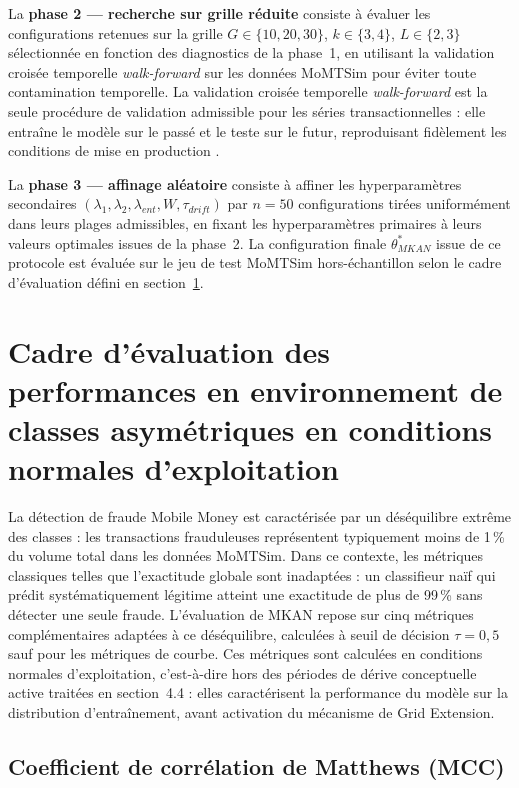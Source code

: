 \documentclass[11pt,a4paper,oneside]{report}
\theoremstyle{definition}
\theoremstyle{remark}
\begin{document}
La \textbf{phase 2 --- recherche sur grille réduite} consiste à évaluer les configurations retenues sur la grille $G \in \{10, 20, 30\}$, $k \in \{3, 4\}$, $L \in \{2, 3\}$ sélectionnée en fonction des diagnostics de la phase~1, en utilisant la validation croisée temporelle \textit{walk-forward} sur les données MoMTSim pour éviter toute contamination temporelle. La validation croisée temporelle \textit{walk-forward} est la seule procédure de validation admissible pour les séries transactionnelles : elle entraîne le modèle sur le passé et le teste sur le futur, reproduisant fidèlement les conditions de mise en production \citep{law2000simulation}.

La \textbf{phase 3 --- affinage aléatoire} consiste à affiner les hyperparamètres secondaires $(\lambda_1, \lambda_2, \lambda_{ent}, W, \tau_{drift})$ par $n = 50$ configurations tirées uniformément dans leurs plages admissibles, en fixant les hyperparamètres primaires à leurs valeurs optimales issues de la phase~2. La configuration finale $\theta^*_{MKAN}$ issue de ce protocole est évaluée sur le jeu de test MoMTSim hors-échantillon selon le cadre d'évaluation défini en section~\ref{sec:evaluation_framework}.

\section{Cadre d'évaluation des performances en environnement de classes asymétriques en conditions normales d'exploitation}
\label{sec:evaluation_framework}

La détection de fraude Mobile Money est caractérisée par un déséquilibre extrême des classes : les transactions frauduleuses représentent typiquement moins de 1\,\% du volume total dans les données MoMTSim. Dans ce contexte, les métriques classiques telles que l'exactitude globale sont inadaptées : un classifieur naïf qui prédit systématiquement \og légitime \fg{} atteint une exactitude de plus de 99\,\% sans détecter une seule fraude. L'évaluation de MKAN repose sur cinq métriques complémentaires adaptées à ce déséquilibre, calculées à seuil de décision $\tau = 0{,}5$ sauf pour les métriques de courbe. Ces métriques sont calculées en conditions normales d'exploitation, c'est-à-dire hors des périodes de dérive conceptuelle active traitées en section~4.4 : elles caractérisent la performance du modèle sur la distribution d'entraînement, avant activation du mécanisme de Grid Extension.

\subsection{Coefficient de corrélation de Matthews (MCC)}
\label{subsec:mcc}
\end{document}
